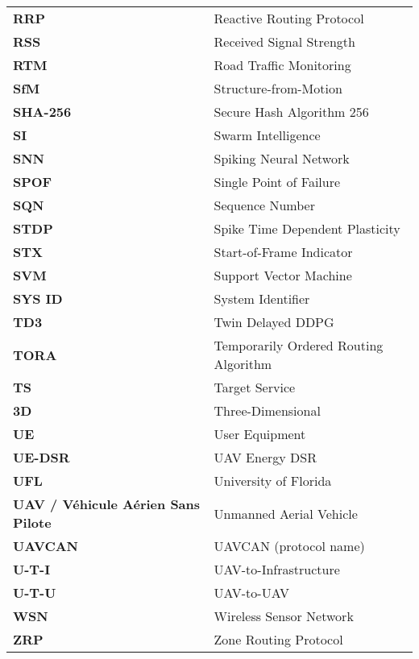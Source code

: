 \begin{longtable}{p{4cm} p{11cm}}
\textbf{RRP} & Reactive Routing Protocol \\
\textbf{RSS} & Received Signal Strength \\
\textbf{RTM} & Road Traffic Monitoring \\
\textbf{SfM} & Structure-from-Motion \\
\textbf{SHA-256} & Secure Hash Algorithm 256 \\
\textbf{SI} & Swarm Intelligence \\
\textbf{SNN} & Spiking Neural Network \\
\textbf{SPOF} & Single Point of Failure \\
\textbf{SQN} & Sequence Number \\
\textbf{STDP} & Spike Time Dependent Plasticity \\
\textbf{STX} & Start-of-Frame Indicator \\
\textbf{SVM} & Support Vector Machine \\
\textbf{SYS ID} & System Identifier \\
\textbf{TD3} & Twin Delayed DDPG \\
\textbf{TORA} & Temporarily Ordered Routing Algorithm \\
\textbf{TS} & Target Service \\
\textbf{3D} & Three-Dimensional \\
\textbf{UE} & User Equipment \\
\textbf{UE-DSR} & UAV Energy DSR \\
\textbf{UFL} & University of Florida \\
\textbf{UAV / Véhicule Aérien Sans Pilote} & Unmanned Aerial Vehicle \\
\textbf{UAVCAN} & UAVCAN (protocol name) \\
\textbf{U-T-I} & UAV-to-Infrastructure \\
\textbf{U-T-U} & UAV-to-UAV \\
\textbf{WSN} & Wireless Sensor Network \\
\textbf{ZRP} & Zone Routing Protocol \\
\end{longtable}
